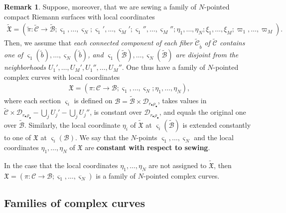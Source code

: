 \documentclass[12pt,a4paper,notitlepage]{report}
\theoremstyle{definition}
\newtheorem{rem}[df]{Remark}
\theoremstyle{plain}
\newcommand{\fk}{\mathfrak}
\newcommand{\mc}{\mathcal}
\newcommand{\wtd}{\widetilde}
\newcommand{\sgm}{\varsigma}
\newcommand{\blt}{\bullet}
\numberwithin{equation}{section}
\begin{document}
\begin{rem}\label{lb39}
Suppose, moreover, that we are sewing a family of $N$-pointed compact Riemann surfaces with local coordinates
\begin{align*}
\wtd{\fk X}=(\wtd\pi:\wtd{\mc C}\rightarrow\wtd{\mc B};\sgm_1,\dots,\sgm_N;\sgm_1',\dots,\sgm_M';\sgm_1'',\dots,\sgm_M'';\eta_1,\dots,\eta_N;\xi_1,\dots,\xi_M;\varpi_1,\dots,\varpi_M).
\end{align*}
Then, we assume that \emph{each connected component of each fiber $\wtd{\mc C}_{\wtd b}$ of $\wtd{\mc C}$ contains one of $\sgm_1(\wtd b),\dots,\sgm_N(\wtd b)$, and  $\sgm_1(\wtd{\mc B}),\dots,\sgm_N(\wtd{\mc B})$ are disjoint from the neighborhoods $U_1',\dots,U_M',U_1'',\dots,U_M''$}. One thus have a family of $N$-pointed complex curves with local coordinates
\begin{align*}
\fk X=(\pi:\mc C\rightarrow\mc B;\sgm_1,\dots,\sgm_N;\eta_1,\dots,\eta_N),
\end{align*}
where each section $\sgm_i$ is defined on $\mc B=\wtd{\mc B}\times\mc D_{r_\blt\rho_\blt}$, takes values in $\wtd {\mc C}\times\mc D_{r_\blt\rho_\blt}-\bigcup_j U_j'-\bigcup_j U_j''$, is constant over $\mc D_{r_\blt\rho_\blt}$, and equals the original one  over  $\wtd{\mc B}$. Similarly, the local coordinate $\eta_i$ of $\wtd{\fk X}$ at $\sgm_i(\wtd{\mc B})$ is extended constantly to one of $\fk X$ at $\sgm_i(\mc B)$. We say that the $N$-points $\sgm_1,\dots,\sgm_N$ and the local coordinates $\eta_1,\dots,\eta_N$ of $\fk X$ are \textbf{constant with respect to sewing}.

In the case that the local coordinates $\eta_1,\dots,\eta_N$ are not assigned to $\wtd{\fk X}$, then $\fk X=(\pi:\mc C\rightarrow\mc B;\sgm_1,\dots,\sgm_N)$ is a family of $N$-pointed complex curves.
\end{rem}

 


\subsection*{Families of complex curves}
\end{document}
